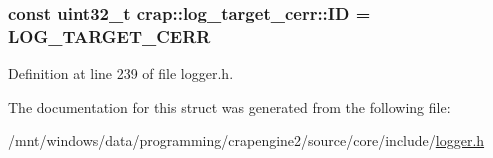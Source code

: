 \subsubsection[{I\+D}]{\setlength{\rightskip}{0pt plus 5cm}const uint32\+\_\+t crap\+::log\+\_\+target\+\_\+cerr\+::\+I\+D = {\bf L\+O\+G\+\_\+\+T\+A\+R\+G\+E\+T\+\_\+\+C\+E\+R\+R}\hspace{0.3cm}{\ttfamily [static]}}\label{structcrap_1_1log__target__cerr_a33b6b749a34b045309cd086d81fa672a}


Definition at line 239 of file logger.\+h.



The documentation for this struct was generated from the following file\+:\begin{DoxyCompactItemize}
\item 
/mnt/windows/data/programming/crapengine2/source/core/include/\hyperlink{logger_8h}{logger.\+h}\end{DoxyCompactItemize}
